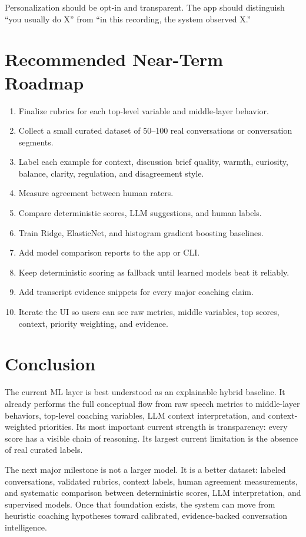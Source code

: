 \documentclass[11pt]{article}
\begin{document}
Personalization should be opt-in and transparent. The app should distinguish ``you usually do X'' from ``in this recording, the system observed X.''

\section{Recommended Near-Term Roadmap}

\begin{enumerate}[leftmargin=*]
  \item Finalize rubrics for each top-level variable and middle-layer behavior.
  \item Collect a small curated dataset of 50--100 real conversations or conversation segments.
  \item Label each example for context, discussion brief quality, warmth, curiosity, balance, clarity, regulation, and disagreement style.
  \item Measure agreement between human raters.
  \item Compare deterministic scores, LLM suggestions, and human labels.
  \item Train Ridge, ElasticNet, and histogram gradient boosting baselines.
  \item Add model comparison reports to the app or CLI.
  \item Keep deterministic scoring as fallback until learned models beat it reliably.
  \item Add transcript evidence snippets for every major coaching claim.
  \item Iterate the UI so users can see raw metrics, middle variables, top scores, context, priority weighting, and evidence.
\end{enumerate}

\section{Conclusion}

The current ML layer is best understood as an explainable hybrid baseline. It already performs the full conceptual flow from raw speech metrics to middle-layer behaviors, top-level coaching variables, LLM context interpretation, and context-weighted priorities. Its most important current strength is transparency: every score has a visible chain of reasoning. Its largest current limitation is the absence of real curated labels.

The next major milestone is not a larger model. It is a better dataset: labeled conversations, validated rubrics, context labels, human agreement measurements, and systematic comparison between deterministic scores, LLM interpretation, and supervised models. Once that foundation exists, the system can move from heuristic coaching hypotheses toward calibrated, evidence-backed conversation intelligence.
\end{document}
